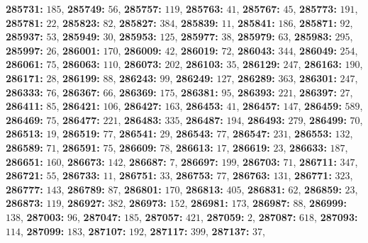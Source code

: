 \textsf{\bfseries 285731:} $185$, \textsf{\bfseries 285749:} $56$, \textsf{\bfseries 285757:} $119$, \textsf{\bfseries 285763:} $41$, \textsf{\bfseries 285767:} $45$, \textsf{\bfseries 285773:} $191$, \textsf{\bfseries 285781:} $22$, \textsf{\bfseries 285823:} $82$, \textsf{\bfseries 285827:} $384$, \textsf{\bfseries 285839:} $11$, \textsf{\bfseries 285841:} $186$, \textsf{\bfseries 285871:} $92$, \textsf{\bfseries 285937:} $53$, \textsf{\bfseries 285949:} $30$, \textsf{\bfseries 285953:} $125$, \textsf{\bfseries 285977:} $38$, \textsf{\bfseries 285979:} $63$, \textsf{\bfseries 285983:} $295$, \textsf{\bfseries 285997:} $26$, \textsf{\bfseries 286001:} $170$, \textsf{\bfseries 286009:} $42$, \textsf{\bfseries 286019:} $72$, \textsf{\bfseries 286043:} $344$, \textsf{\bfseries 286049:} $254$, \textsf{\bfseries 286061:} $75$, \textsf{\bfseries 286063:} $110$, \textsf{\bfseries 286073:} $202$, \textsf{\bfseries 286103:} $35$, \textsf{\bfseries 286129:} $247$, \textsf{\bfseries 286163:} $190$, \textsf{\bfseries 286171:} $28$, \textsf{\bfseries 286199:} $88$, \textsf{\bfseries 286243:} $99$, \textsf{\bfseries 286249:} $127$, \textsf{\bfseries 286289:} $363$, \textsf{\bfseries 286301:} $247$, \textsf{\bfseries 286333:} $76$, \textsf{\bfseries 286367:} $66$, \textsf{\bfseries 286369:} $175$, \textsf{\bfseries 286381:} $95$, \textsf{\bfseries 286393:} $221$, \textsf{\bfseries 286397:} $27$, \textsf{\bfseries 286411:} $85$, \textsf{\bfseries 286421:} $106$, \textsf{\bfseries 286427:} $163$, \textsf{\bfseries 286453:} $41$, \textsf{\bfseries 286457:} $147$, \textsf{\bfseries 286459:} $589$, \textsf{\bfseries 286469:} $75$, \textsf{\bfseries 286477:} $221$, \textsf{\bfseries 286483:} $335$, \textsf{\bfseries 286487:} $194$, \textsf{\bfseries 286493:} $279$, \textsf{\bfseries 286499:} $70$, \textsf{\bfseries 286513:} $19$, \textsf{\bfseries 286519:} $77$, \textsf{\bfseries 286541:} $29$, \textsf{\bfseries 286543:} $77$, \textsf{\bfseries 286547:} $231$, \textsf{\bfseries 286553:} $132$, \textsf{\bfseries 286589:} $71$, \textsf{\bfseries 286591:} $75$, \textsf{\bfseries 286609:} $78$, \textsf{\bfseries 286613:} $17$, \textsf{\bfseries 286619:} $23$, \textsf{\bfseries 286633:} $187$, \textsf{\bfseries 286651:} $160$, \textsf{\bfseries 286673:} $142$, \textsf{\bfseries 286687:} $7$, \textsf{\bfseries 286697:} $199$, \textsf{\bfseries 286703:} $71$, \textsf{\bfseries 286711:} $347$, \textsf{\bfseries 286721:} $55$, \textsf{\bfseries 286733:} $11$, \textsf{\bfseries 286751:} $33$, \textsf{\bfseries 286753:} $77$, \textsf{\bfseries 286763:} $131$, \textsf{\bfseries 286771:} $323$, \textsf{\bfseries 286777:} $143$, \textsf{\bfseries 286789:} $87$, \textsf{\bfseries 286801:} $170$, \textsf{\bfseries 286813:} $405$, \textsf{\bfseries 286831:} $62$, \textsf{\bfseries 286859:} $23$, \textsf{\bfseries 286873:} $119$, \textsf{\bfseries 286927:} $382$, \textsf{\bfseries 286973:} $152$, \textsf{\bfseries 286981:} $173$, \textsf{\bfseries 286987:} $88$, \textsf{\bfseries 286999:} $138$, \textsf{\bfseries 287003:} $96$, \textsf{\bfseries 287047:} $185$, \textsf{\bfseries 287057:} $421$, \textsf{\bfseries 287059:} $2$, \textsf{\bfseries 287087:} $618$, \textsf{\bfseries 287093:} $114$, \textsf{\bfseries 287099:} $183$, \textsf{\bfseries 287107:} $192$, \textsf{\bfseries 287117:} $399$, \textsf{\bfseries 287137:} $37$, 
